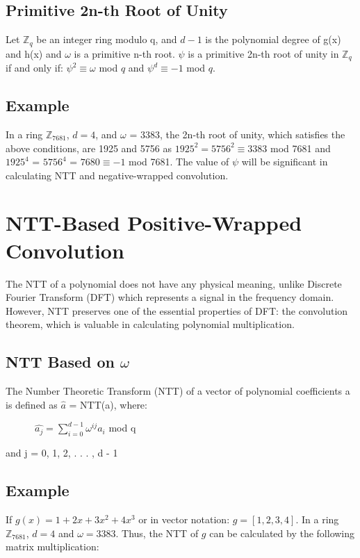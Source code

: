 \documentclass{techrep}
\theoremstyle{definition}
\theoremstyle{plain}
\newcommand{\Z}{\mathbb{Z}}
\begin{document}
\subsection{Primitive 2n-th Root of Unity}
Let $\Z_{q}$  be an integer ring modulo q, and $d - 1$ is the polynomial degree of g(x) and h(x) and $\omega$ is a primitive n-th root. $\psi$ is a primitive 2n-th root of unity in $\Z_{q}$ if and only if:
$\psi^2 \equiv \omega$ mod $q$ and $\psi^d \equiv {-1}$ mod $q$. 

\subsection{Example}

In a ring $\Z_{7681}$, $d = 4$, and $\omega$ = 3383, the 2n-th root of unity, which satisfies the above conditions, are 1925 and 5756 as $1925^2 = 5756^2 \equiv 3383$ mod 7681 and $1925^4$ = $5756^4$ = $7680 \equiv -1$ mod 7681. The value of $\psi$  will be significant in calculating NTT and negative-wrapped convolution.

\section{NTT-Based Positive-Wrapped Convolution}
The NTT of a polynomial does not have any physical meaning, unlike Discrete Fourier Transform (DFT) which represents a signal in the frequency domain. However, NTT preserves one of the essential properties of DFT: the convolution theorem, which is valuable in calculating polynomial multiplication.

\subsection{NTT Based on $\omega$}
The Number Theoretic Transform (NTT) of a vector of polynomial coefficients a is defined as $\hat{a}$ = NTT(a), where:

$\quad \quad \quad \hat{a_j} = \sum_{i=0}^{d - 1}\omega^{ij}a_i$ mod q

and j = 0, 1, 2, . . . , d - 1

\subsection{Example}

If $g(x) = 1 + 2x + 3x^2 + 4x^3$ or in vector notation:  $g = [1, 2, 3, 4]$. 
In a ring $\Z_{7681}$, $d = 4$ and $\omega =3383$. Thus, the NTT of $g$ can be calculated by the following matrix multiplication:
\end{document}
